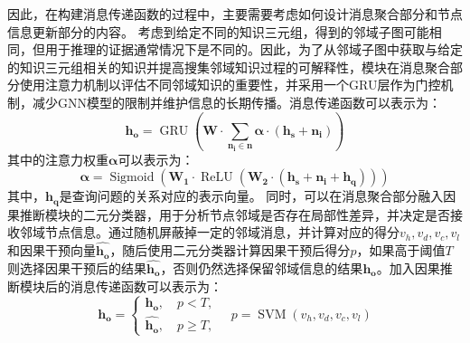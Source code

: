 \documentclass[algorithmlist, AutoFakeBold, AutoFakeSlant, figurelist, tablelist, nomlist, masters]{seuthesix}
\begin{document}
因此，在构建消息传递函数的过程中，主要需要考虑如何设计消息聚合部分和节点信息更新部分的内容。
考虑到给定不同的知识三元组，得到的邻域子图可能相同，但用于推理的证据通常情况下是不同的。因此，为了从邻域子图中获取与给定的知识三元组相关的知识并提高搜集邻域知识过程的可解释性，模块在消息聚合部分使用注意力机制以评估不同邻域知识的重要性，并采用一个GRU层作为门控机制，减少GNN模型的限制并维护信息的长期传播。消息传递函数可以表示为：
\begin{equation}
  \bm{h_o} = \operatorname{GRU}(\mathbf{W} \cdot \sum_{\bm{n_i} \in \bm{n}}{\mathbf{\alpha} \cdot (\bm{h_s} + \bm{n_i})})
  \label{equation_newMessagePassing}
\end{equation}
其中的注意力权重$\mathbf{\alpha}$可以表示为：
\begin{equation}
  \mathbf{\alpha} = \operatorname{Sigmoid}(\mathbf{W_{1}} \cdot \operatorname{ReLU}(\mathbf{W_{2}} \cdot (\bm{h_s} + \bm{n_i} + \bm{h_q})))
  \label{equation_Alpha}
\end{equation}
其中，$\bm{h_q}$是查询问题的关系对应的表示向量。
同时，可以在消息聚合部分融入因果推断模块的二元分类器，用于分析节点邻域是否存在局部性差异，并决定是否接收邻域节点信息。通过随机屏蔽掉一定的邻域消息，并计算对应的得分$v_h, v_d, v_c, v_l$和因果干预向量$\bm{\hat{h_o}}$，随后使用二元分类器计算因果干预后得分$p$，如果高于阈值$T$则选择因果干预后的结果$\bm{\hat{h_o}}$，否则仍然选择保留邻域信息的结果$\bm{h_o}$。加入因果推断模块后的消息传递函数可以表示为：
\begin{equation}
  \bm{h_o} = \left\{\begin{array}{l}
  \bm{h_o},\quad p < T, \\
  \bm{\hat{h_o}},\quad p \geq T,
  \end{array} \quad p = \operatorname{SVM}\left(v_h, v_d, v_c, v_l\right)\right.
  \label{equation_finalMessagePassing}
\end{equation}
\end{document}
